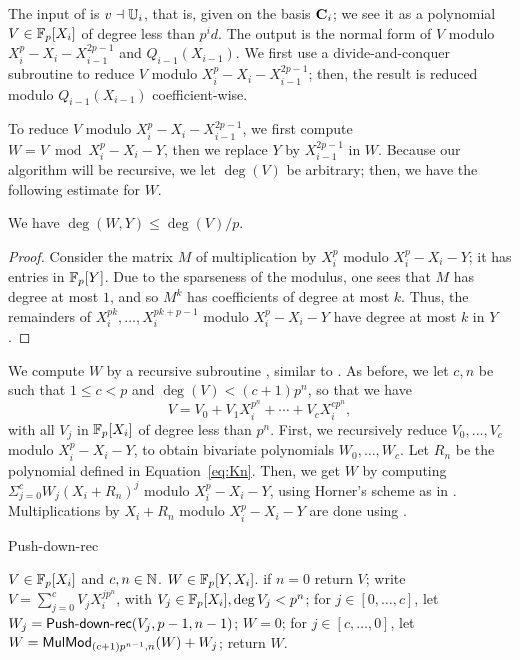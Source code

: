 The input of  is $v \dashv \mathbb{U}_i$, that is, given on the
basis $\mathbf{C}_i$; we see it as a polynomial $V \in \mathbb{F}_p[X_i]$ of degree
less than $p^id$. The output is the normal form of $V$ modulo
$X_i^p-X_i-X_{i-1}^{2p-1}$ and $Q_{i-1}(X_{i-1})$. We first use a
divide-and-conquer subroutine to reduce $V$ modulo
$X_i^p-X_i-X_{i-1}^{2p-1}$; then, the result is reduced modulo
$Q_{i-1}(X_{i-1})$ coefficient-wise.

To reduce $V$ modulo $X_i^p-X_i-X_{i-1}^{2p-1}$, we first compute $W=V
\bmod X_i^p-X_i-Y$, then we replace $Y$ by $X_{i-1}^{2p-1}$ in $W$.
Because our algorithm will be recursive, we let $\deg(V)$ be
arbitrary; then, we have the following estimate for $W$.

\begin{lemma}
  \label{th:push-down-degree} We have $\deg(W,Y)\le \deg(V)/p$.
\end{lemma}
\begin{proof}
  Consider the matrix $M$ of multiplication by $X_i^p$ modulo
  $X_i^p-X_i-Y$; it has entries in $\mathbb{F}_p[Y]$. Due to the sparseness of
  the modulus, one sees that $M$ has degree at most $1$, and so $M^k$
  has coefficients of degree at most $k$. Thus, the remainders of
  $X_i^{pk},\dots,X_i^{pk+p-1}$ modulo $X_i^p-X_i-Y$ have degree at
  most $k$ in $Y$.
\end{proof}


We compute $W$ by a recursive subroutine , similar
to . As before, we let $c,n$ be such that $1\le c<p$ and
$\deg(V) < (c+1)p^n$, so that we have
$$V=V_0+ V_1X_i^{p^n}+\cdots+V_c X_i^{cp^n},$$ with all $V_j$ in
$\mathbb{F}_p[X_i]$ of degree less than $p^n$. First, we recursively reduce
$V_0,\dots,V_c$ modulo $X_i^p-X_i-Y$, to obtain bivariate
polynomials $W_0,\dots,W_{c}$. Let $R_n$ be the polynomial defined in
Equation~\eqref{eq:Kn}. Then, we get $W$ by computing
$\Sigma_{j=0}^c W_j(X_i+R_n)^j$ modulo $X_i^p-X_i-Y$,
using Horner's scheme as in . Multiplications by
$X_i+R_n$ modulo $X_i^p-X_i-Y$ are done using .

\begin{algorithm}
  \caption{Push-down-rec}
  \begin{algorithmic}[1]
    \REQUIRE $V\in \mathbb{F}_p[X_i]$ and $c,n\in\mathbb{N}$.
    \ENSURE $W \in\mathbb{F}_p[Y,X_i]$.
    \STATE if $n=0$ return $V$;
    \STATE write $V=\sum_{j=0}^{c} V_j X_i^{jp^n}$, with $V_j \in \mathbb{F}_p[X_i], \deg V_j<p^n$;
    \STATE for $j\in [0,\dots,c]$, let $W_j=\text{{\sf Push-down-rec}}(V_j,p-1,n-1)$;
    \STATE $W=0$;
    \STATE\label{pd:loop} for $j\in [c,\dots,0]$, let $W = {\sf MulMod}_{(c+1)p^{n-1},n}(W) + W_j$;
    \STATE return $W$.
  \end{algorithmic}
\end{algorithm}

